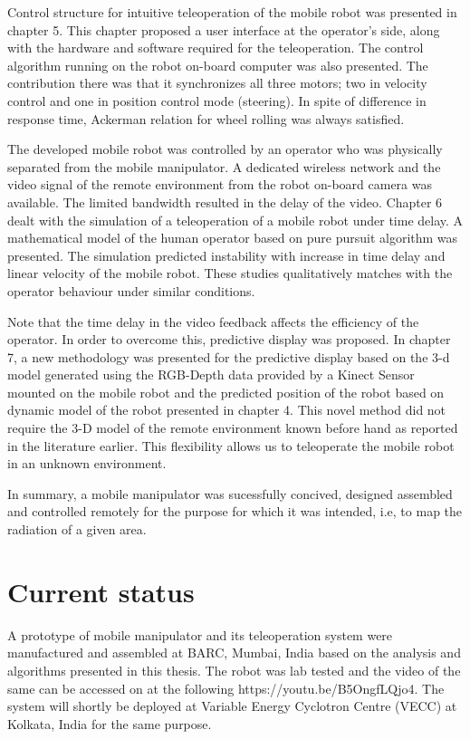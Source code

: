 Control structure for intuitive teleoperation of the mobile robot was presented in chapter 5. This chapter proposed a  user interface at the operator's side, along with the hardware and software required for the teleoperation. The control algorithm running on the robot on-board computer was also presented. The contribution there was that it synchronizes all three motors; two in velocity control  and one in position control mode (steering). In spite of difference in response time, Ackerman relation for wheel rolling was always satisfied. 

The developed mobile robot was controlled by an operator who was  physically separated from the mobile manipulator. A dedicated wireless network and the video signal of the remote environment from the robot on-board camera was available. The limited bandwidth resulted in the delay of the video. 
Chapter 6 dealt with the simulation of a teleoperation of a mobile robot under time delay.
 A mathematical model of the human operator based on pure pursuit algorithm was presented. 
 The simulation  predicted instability with increase in time delay and linear velocity of the mobile robot.
  These studies qualitatively matches with the operator behaviour under similar conditions.

   Note that the time delay in the video feedback affects the efficiency of the operator. 
   In order to overcome this, predictive display was proposed.
   In chapter 7,  a new methodology was presented for the predictive display based on the 3-d model generated using the RGB-Depth data provided by a Kinect Sensor mounted on the mobile robot and the predicted position of the robot based on dynamic model of the robot presented in chapter 4.
   This novel method did not require  the 3-D model of the remote environment known before hand as reported in the literature earlier.
   This flexibility allows us to teleoperate  the mobile robot in an unknown environment. 
   
   In summary, a mobile manipulator was sucessfully concived, designed assembled and controlled remotely  for the purpose for which it was intended, i.e, to map the radiation of a given area.
   
   \section{Current status} 
   A prototype of  mobile manipulator and its teleoperation system were   manufactured and assembled at BARC, Mumbai, India based on the analysis and algorithms presented in this thesis. The robot was lab tested and the video of the same can be accessed on at the following https://youtu.be/B5OngfLQjo4. The system will  shortly  be deployed at Variable Energy Cyclotron Centre (VECC) at Kolkata, India for the same purpose. 


